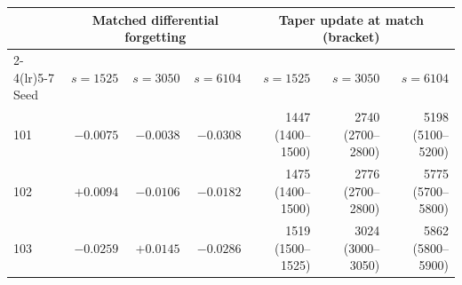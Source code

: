 \begin{tabular}{@{}lrrrrrr@{}}
\toprule
 & \multicolumn{3}{c}{Matched differential forgetting} & \multicolumn{3}{c}{Taper update at match (bracket)} \\
\cmidrule(lr){2-4}\cmidrule(lr){5-7}
Seed & $s{=}1525$ & $s{=}3050$ & $s{=}6104$ & $s{=}1525$ & $s{=}3050$ & $s{=}6104$ \\
\midrule
101 & $-0.0075$ & $-0.0038$ & $-0.0308$ & 1447 (1400--1500) & 2740 (2700--2800) & 5198 (5100--5200) \\
102 & ${+}0.0094$ & $-0.0106$ & $-0.0182$ & 1475 (1400--1500) & 2776 (2700--2800) & 5775 (5700--5800) \\
103 & $-0.0259$ & ${+}0.0145$ & $-0.0286$ & 1519 (1500--1525) & 3024 (3000--3050) & 5862 (5800--5900) \\
\bottomrule
\end{tabular}
